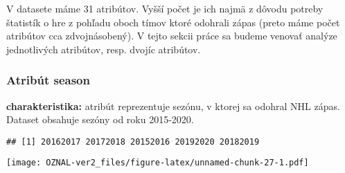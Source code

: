 \documentclass[
]{article}
\newenvironment{Shaded}{\begin{snugshade}}{\end{snugshade}}
\newcommand{\AttributeTok}[1]{\textcolor[rgb]{0.77,0.63,0.00}{#1}}
\newcommand{\DecValTok}[1]{\textcolor[rgb]{0.00,0.00,0.81}{#1}}
\newcommand{\FloatTok}[1]{\textcolor[rgb]{0.00,0.00,0.81}{#1}}
\newcommand{\FunctionTok}[1]{\textcolor[rgb]{0.00,0.00,0.00}{#1}}
\newcommand{\NormalTok}[1]{#1}
\newcommand{\SpecialCharTok}[1]{\textcolor[rgb]{0.00,0.00,0.00}{#1}}
\newcommand{\StringTok}[1]{\textcolor[rgb]{0.31,0.60,0.02}{#1}}
\begin{document}
V datasete máme 31 atribútov. Vyšší počet je ich najmä z dôvodu potreby
štatistík o hre z pohľadu oboch tímov ktoré odohrali zápas (preto máme
počet atribútov cca zdvojnásobený). V tejto sekcii práce sa budeme
venovať analýze jednotlivých atribútov, resp. dvojíc atribútov.

\hypertarget{atribuxfat-season}{%
\subsubsection{Atribút season}\label{atribuxfat-season}}

\textbf{charakteristika:} atribút reprezentuje sezónu, v ktorej sa
odohral NHL zápas. Dataset obsahuje sezóny od roku 2015-2020.

\begin{Shaded}
\end{Shaded}

\begin{verbatim}
## [1] 20162017 20172018 20152016 20192020 20182019
\end{verbatim}

\begin{Shaded}
\end{Shaded}

\texttt{[image: OZNAL-ver2\_files/figure-latex/unnamed-chunk-27-1.pdf]}

\begin{Shaded}
\end{Shaded}
\end{document}
